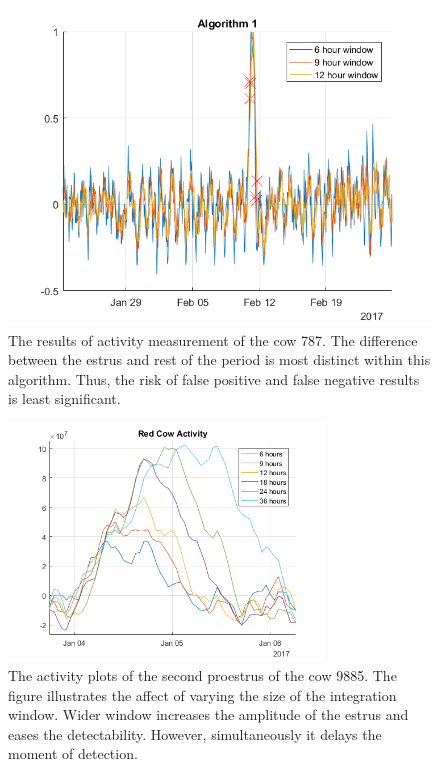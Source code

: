 \documentclass[english,12pt,a4paper,pdftex,elec,utf8]{aaltothesis}
\begin{document}
\begin{figure}[htb]
\centering
\includegraphics[width = 0.75 \textwidth]{figures/algorithm1_cow787}
\caption{The results of activity measurement of the cow 787. The difference between the estrus and rest of the period is most distinct within this algorithm. Thus, the risk of false positive and false negative results is least significant.}
\label{algorithm1_cow787}
\end{figure}





\begin{figure}[htb]
\centering
\includegraphics[width = 0.75\textwidth]{figures/redcowactivity2.png}
\caption{The activity plots of the second proestrus of the cow 9885. The figure illustrates the affect of varying the size of the integration window. Wider window increases the amplitude of the estrus and eases the detectability. However, simultaneously it delays the moment of detection. }
\label{integrationwindows}
\end{figure}
\end{document}
